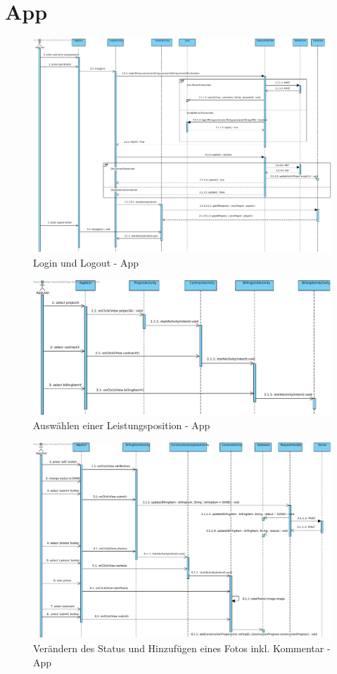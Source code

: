 \section{App}
\begin{figure}[H]
	\centering
	\includegraphics[width=\linewidth]{img/diagrams/App login, pull data, logout.pdf}		
	\caption{Login und Logout - App}
	\label{fig:sequenzdiagramm-app}
\end{figure}

\begin{figure}[H]
\centering
\includegraphics[width=\linewidth]{img/diagrams/Select BillingItem.pdf}		
\caption{Auswählen einer Leistungsposition - App}
\label{fig:sequenzdiagramm-app}
\end{figure}

\begin{figure}[H]
	\centering
	\includegraphics[width=\linewidth]{img/diagrams/change status, take photo.pdf}		
	\caption{Verändern des Status und Hinzufügen eines Fotos inkl. Kommentar - App}
	\label{fig:sequenzdiagramm-app}
\end{figure}